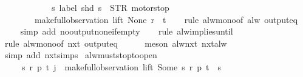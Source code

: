 \begin{isabellebody}
\ \ \ \ \ \ \ \ \ \ \ \ {\isacharparenleft}{\isasymlambda}s{\isachardot}\ label\ {\isacharparenleft}shd\ s{\isacharparenright}\ {\isacharequal}\ STR\ {\isacharprime}{\isacharprime}motorstop{\isacharprime}{\isacharprime}{\isacharparenright}{\isacharparenright}\isanewline
\ \ \ \ \ \ \ \ {\isacharparenleft}make{\isacharunderscore}full{\isacharunderscore}observation\ lift\ None\ r\ {\isacharbrackleft}{\isacharbrackright}\ t{\isacharparenright}{\isachardoublequoteclose}\isanewline
%
\isadelimproof
\ \ %
\endisadelimproof
%
\isatagproof
{}\isamarkupfalse%
\ {\isacharparenleft}rule\ alw{\isacharunderscore}mono{\isacharbrackleft}of\ {\isachardoublequoteopen}alw\ {\isacharparenleft}output{\isacharunderscore}eq\ {\isacharbrackleft}{\isacharbrackright}{\isacharparenright}{\isachardoublequoteclose}{\isacharbrackright}{\isacharparenright}\isanewline
\ \ \ \isamarkupfalse%
\ {\isacharparenleft}simp\ add{\isacharcolon}\ no{\isacharunderscore}output{\isacharunderscore}none{\isacharunderscore}if{\isacharunderscore}empty{\isacharparenright}\isanewline
\ \ \isamarkupfalse%
\ {\isacharparenleft}rule\ alw{\isacharunderscore}implies{\isacharunderscore}until{\isacharparenright}\isanewline
\ \ \isamarkupfalse%
\ {\isacharparenleft}rule\ alw{\isacharunderscore}mono{\isacharbrackleft}of\ {\isachardoublequoteopen}nxt\ {\isacharparenleft}output{\isacharunderscore}eq\ {\isacharbrackleft}{\isacharbrackright}{\isacharparenright}{\isachardoublequoteclose}{\isacharbrackright}{\isacharparenright}\isanewline
\ \ \ \isamarkupfalse%
\ {\isacharparenleft}meson\ alw{\isacharunderscore}nxt\ nxt{\isacharunderscore}alw{\isacharparenright}\isanewline
\ \ \isamarkupfalse%
\ {\isacharparenleft}simp\ add{\isacharcolon}\ nxt{\isachardot}simps{\isacharparenright}%
\endisatagproof
{\isafoldproof}%
%
\isadelimproof
\isanewline
%
\endisadelimproof
\isanewline
\isanewline
\isanewline
\isanewline
{}\isamarkupfalse%
\ alw{\isacharunderscore}must{\isacharunderscore}stop{\isacharunderscore}to{\isacharunderscore}open{\isacharcolon}\isanewline
\ \ \ \ \ {\isachardoublequoteopen}{\isasymexists}s\ r\ p\ t{\isachardot}\ j\ {\isacharequal}\ {\isacharparenleft}make{\isacharunderscore}full{\isacharunderscore}observation\ lift\ {\isacharparenleft}Some\ s{\isacharparenright}\ r\ p\ t{\isacharparenright}\ {\isasymand}\ s\ {\isasymnotin}\ {\isacharbraceleft}{}{\isacharcomma}\ {}{\isacharcomma}\ {}{\isacharcomma}\ {}{\isacharbraceright}{\isachardoublequoteclose}\isanewline

\end{isabellebody}
